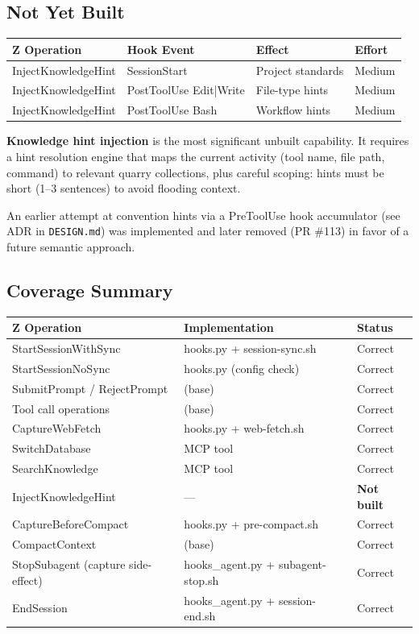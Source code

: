 \documentclass[a4paper,10pt,fleqn]{article}
\begin{document}
\subsection{Not Yet Built}

\begin{tabular}{llll}
\hline
\textbf{Z Operation} & \textbf{Hook Event} & \textbf{Effect} & \textbf{Effort} \\
\hline
InjectKnowledgeHint & SessionStart & Project standards & Medium \\
InjectKnowledgeHint & PostToolUse Edit|Write & File-type hints & Medium \\
InjectKnowledgeHint & PostToolUse Bash & Workflow hints & Medium \\
\hline
\end{tabular}

\textbf{Knowledge hint injection} is the most significant unbuilt
capability.  It requires a hint resolution engine that maps the
current activity (tool name, file path, command) to relevant quarry
collections, plus careful scoping: hints must be short (1--3
sentences) to avoid flooding context.

An earlier attempt at convention hints via a PreToolUse hook
accumulator (see ADR in \texttt{DESIGN.md}) was implemented and
later removed (PR \#113) in favor of a future semantic approach.

\subsection{Coverage Summary}

\begin{tabular}{lll}
\hline
\textbf{Z Operation} & \textbf{Implementation} & \textbf{Status} \\
\hline
StartSessionWithSync & hooks.py + session-sync.sh & Correct \\
StartSessionNoSync & hooks.py (config check) & Correct \\
SubmitPrompt / RejectPrompt & (base) & Correct \\
Tool call operations & (base) & Correct \\
CaptureWebFetch & hooks.py + web-fetch.sh & Correct \\
SwitchDatabase & MCP tool & Correct \\
SearchKnowledge & MCP tool & Correct \\
InjectKnowledgeHint & --- & \textbf{Not built} \\
CaptureBeforeCompact & hooks.py + pre-compact.sh & Correct \\
CompactContext & (base) & Correct \\
StopSubagent (capture side-effect) & hooks\_agent.py + subagent-stop.sh & Correct \\
EndSession & hooks\_agent.py + session-end.sh & Correct \\
\hline
\end{tabular}
\end{document}

